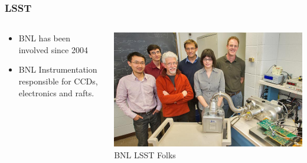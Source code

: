\documentclass{beamer}
\begin{document}
\frame
{
    \frametitle{LSST}

    \begin{columns}
        \begin{column}{0.5\textwidth}    

            \begin{itemize}

                \item BNL has been involved since 2004

                \item BNL Instrumentation responsible for CCDs, electronics
                    and rafts.


            \end{itemize}
        \end{column}
        \begin{column}{0.5\textwidth}    
            \includegraphics[width=\textwidth]{lsst-folks.jpg}
            \newline
            \hfill {\tiny BNL LSST Folks}
        \end{column}
    \end{columns}
}
\end{document}
